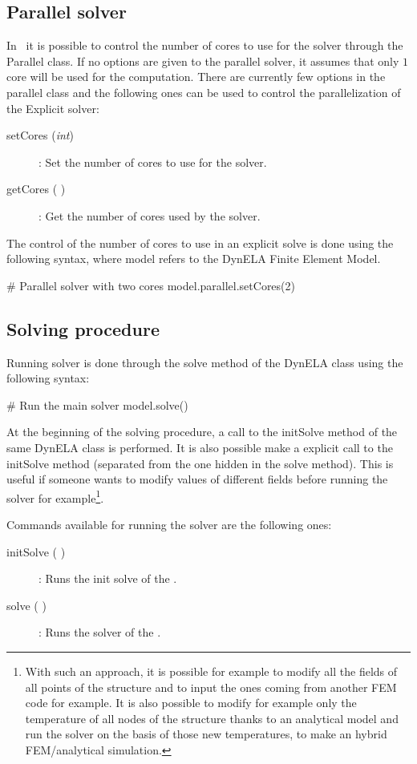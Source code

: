 \subsection{Parallel solver}
In \DynELA~it is possible to control the number of cores to use for the solver through the \textsf{Parallel} class. If no options are given to the parallel solver, it assumes that only $1$ core will be used for the computation. There are currently few options in the parallel class and the following ones can be used to control the parallelization of the Explicit solver:
\begin{description}
\item [{setCores (\emph{int})}] : Set the number of cores to use for the solver.
\item [{getCores ( )}] : Get the number of cores used by the solver. 
\end{description}
The control of the number of cores to use in an explicit solve is done using the following syntax, where \textsf{model} refers to the DynELA Finite Element Model.
\begin{PythonListing}
# Parallel solver with two cores
model.parallel.setCores(2)
\end{PythonListing}

\subsection{Solving procedure}
Running solver is done through the \textsf{solve} method of the \textsf{DynELA} class using the following syntax:
\begin{PythonListing}
# Run the main solver
model.solve()
\end{PythonListing}
At the beginning of the solving procedure, a call to the \textsf{initSolve} method of the same \textsf{DynELA} class is performed. It is also possible make a explicit call to the \textsf{initSolve} method (\ie separated from the one hidden in the solve method). This is useful if someone wants to modify values of different fields before running the solver for example\footnote{With such an approach, it is possible for example to modify all the fields of all points of the structure and to input the ones coming from another FEM code for example. It is also possible to modify for example only the temperature of all nodes of the structure thanks to an analytical model and run the solver on the basis of those new temperatures, \ie to make an hybrid FEM/analytical simulation.}.

Commands available for running the solver are the following ones:
\begin{description}
\item [{initSolve ( )}] : Runs the init solve of the \DynELA.
\item [{solve ( )}] : Runs the solver of the \DynELA.
\end{description}


